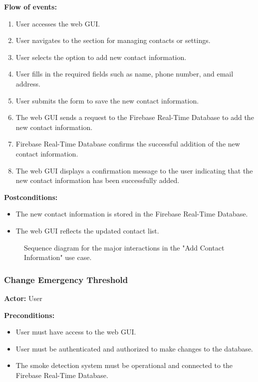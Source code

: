 \textbf{Flow of events:}
\begin{enumerate}
    \item User accesses the web GUI.
    \item User navigates to the section for managing contacts or settings.
    \item User selects the option to add new contact information.
    \item User fills in the required fields such as name, phone number, and email address.
    \item User submits the form to save the new contact information.
    \item The web GUI sends a request to the Firebase Real-Time Database to add the new contact information.
    \item Firebase Real-Time Database confirms the successful addition of the new contact information.
    \item The web GUI displays a confirmation message to the user indicating that the new contact information has been
          successfully added.
\end{enumerate}

\textbf{Postconditions:}
\begin{itemize}
    \item The new contact information is stored in the Firebase Real-Time Database.
    \item The web GUI reflects the updated contact list.
\end{itemize}

\begin{figure}[H]
    \centering
    \caption{Sequence diagram for the major interactions in the "Add Contact Information" use case.}
\end{figure}

\subsubsection{Change Emergency Threshold}

\textbf{Actor:} User

\textbf{Preconditions:}
\begin{itemize}
    \item User must have access to the web GUI.
    \item User must be authenticated and authorized to make changes to the database.
    \item The smoke detection system must be operational and connected to the Firebase Real-Time Database.
\end{itemize}

